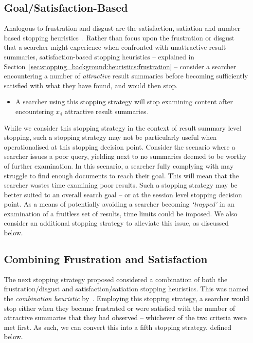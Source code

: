 \subsection{Goal/Satisfaction-Based}
Analogous to frustration and disgust are the satisfaction, satiation and number-based stopping heuristics~\citep{cooper1973retrieval_effectiveness_ii, simon1955satiation, gibb1958number_rule}. Rather than focus upon the frustration or disgust that a searcher might experience when confronted with unattractive result summaries, satisfaction-based stopping heuristics -- explained in Section~\ref{sec:stopping_background:heuristics:frustration} -- consider a searcher encountering a number of \emph{attractive} result summaries before becoming sufficiently satisfied with what they have found, and would then stop.

\begin{itemize}
    \item{ A searcher using this stopping strategy will stop examining content after encountering $x_4$ attractive result summaries.}
\end{itemize}

While we consider this stopping strategy in the context of result summary level stopping, such a stopping strategy may not be particularly useful when operationalised at this stopping decision point. Consider the scenario where a searcher issues a poor query, yielding next to no summaries deemed to be worthy of further examination. In this scenario, a searcher fully complying with  may struggle to find enough documents to reach their goal. This will mean that the searcher wastes time examining poor results. Such a stopping strategy may be better suited to an overall search goal -- or at the session level stopping decision point. As a means of potentially avoiding a searcher becoming \emph{`trapped'} in an examination of a fruitless set of results, time limits could be imposed. We also consider an additional stopping strategy to alleviate this issue, as discussed below.

\subsection{Combining Frustration and Satisfaction}
The next stopping strategy proposed considered a combination of both the frustration/disgust and satisfaction/satiation stopping heuristics. This was named the \emph{combination heuristic} by~\cite{kraft1979stopping_rules}. Employing this stopping strategy, a searcher would stop either when they became frustrated or were satisfied with the number of attractive summaries that they had observed -- whichever of the two criteria were met first. As such, we can convert this into a fifth stopping strategy, defined below.

